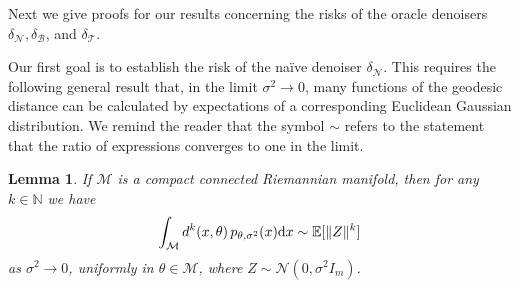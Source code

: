 \documentclass[preprint]{imsart}
\theoremstyle{plain}
\newtheorem{lemma}[theorem]{Lemma}
\theoremstyle{definition}
\newcommand{\Nbb}{\mathbb{N}}
\newcommand{\Ebb}{\mathbb{E}}
\newcommand{\Ncal}{\mathcal{N}}
\newcommand{\Mcal}{\mathcal{M}}
\newcommand{\diff}{\textnormal{d}}
\newcommand{\B}{\mathcal{B}}
\newcommand{\N}{\mathcal{N}}
\newcommand{\T}{\mathcal{T}}
\begin{document}
\begin{appendix}
Next we give proofs for our results concerning the risks of the oracle denoisers $\delta_{\N},\delta_{\B}$, and $\delta_{\T}$.

Our first goal is to establish the risk of the na\"ive denoiser $\delta_{\N}$.
This requires the following general result that, in the limit $\sigma^2\to 0$, many functions of the geodesic distance can be calculated by expectations of a corresponding Euclidean Gaussian distribution.
We remind the reader that the symbol $\sim$ refers to the statement that the ratio of expressions converges to one in the limit.

\begin{lemma}\label{lem:integral-limit}
If $\Mcal$ is a compact connected Riemannian manifold, then for any $k\in\Nbb$ we have
\begin{equation*}
\int_{\Mcal}d^k(x,\theta)\,p_{\theta,\sigma^2}(x)\diff x
\sim
\Ebb[\|Z\|^k]
\end{equation*}
as $\sigma^2\to 0$, uniformly in $\theta\in\Mcal$, where
$Z\sim \Ncal(0,\sigma^2I_m)$.
\end{lemma}


\end{appendix}
\end{document}
